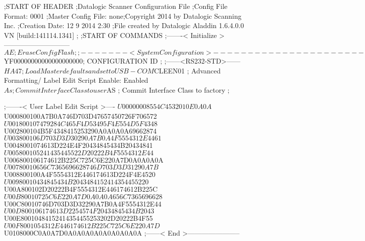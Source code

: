 ;START OF HEADER
;Datalogic Scanner Configuration File
;Config File Format: 0001
;Master Config File: none;Copyright 2014 by Datalogic Scanning Inc.
;Creation Date: 12 9 2014 2:30
;File created by Datalogic Aladdin 1.6.4.0.0 VN [build:141114.1341]
;
;START OF COMMANDS
;-------< Initialize >-----------------------------
$AE                 ; Erase Config Flash
;
;-------< System Configuration >-------------------------------
$YF00000000000000000000; CONFIGURATION ID
;
;------<RS232-STD>------
$HA47               ; Load Master defaults and set to USB-COM
$CLEEN01            ; Advanced Formatting/ Label Edit Script Enable: Enabled
$As                 ; Commit Interface Class to user
$AS                 ; Commit Interface Class to factory
;

;-------< User Label Edit Script >----
$U00000008554C4532010E0A0A
$U000800100A7B0A746D703D47657450726F706572
$U001800107479284C465F4D53495F4E554D5F4348
$U002800104B5F4348415253290A0A0A0A69662874
$U003800106D703D3D30290A7B0A4F5554312E4461
$U0048001074613D224E4F20434845434B20434841
$U005800105241435445522D20222B4F5554312E44
$U006800106174612B225C725C6E220A7D0A0A0A0A
$U00780010656C7365696628746D703D3D31290A7B
$U008800100A4F5554312E446174613D224F4E4520
$U00980010434845434B2043484152414354455220
$U00A800102D20222B4F5554312E446174612B225C
$U00B80010725C6E220A7D0A0A0A656C7365696628
$U00C80010746D703D3D32290A7B0A4F5554312E44
$U00D800106174613D2254574F20434845434B2043
$U00E80010484152414354455253202D20222B4F55
$U00F8001054312E446174612B225C725C6E220A7D
$U0108000C0A0A7D0A0A0A0A0A0A0A0A0A
;------< End >-----------------------
